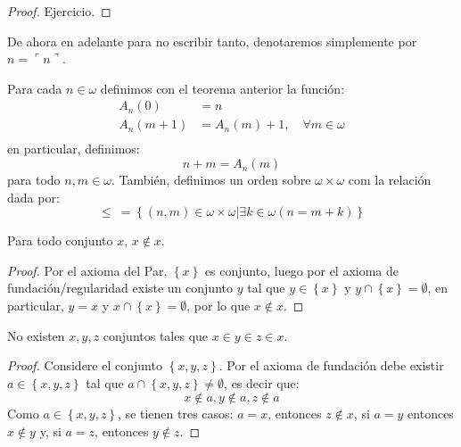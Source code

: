 \documentclass[12pt]{report}
\newcounter{it}
\theoremstyle{largebreak}
\newcommand{\winecomma}[1]{\ensuremath{\ulcorner#1\urcorner}}
\begin{document}
    \begin{proof}
        Ejercicio.
    \end{proof}

    \begin{obs}
        De ahora en adelante para no escribir tanto, denotaremos simplemente por $n=\winecomma{n}$.
    \end{obs}

    \begin{mydef}
        Para cada $n\in\omega$ definimos con el teorema anterior la función:
        \begin{equation*}
            \begin{split}
                A_n(0)&=n\\
                A_n(m+1)&=A_n(m)+1,\quad\forall m\in\omega \\
            \end{split}
        \end{equation*}
        en particular, definimos:
        \begin{equation*}
            n+m=A_n(m)
        \end{equation*}
        para todo $n,m\in\omega$. También, definimos un orden sobre $\omega\times\omega$ com la relación dada por:
        \begin{equation*}
            \leq \:= \left\{(n,m)\in\omega\times\omega\Big|\exists k\in\omega(n=m+k)\right\}
        \end{equation*}
    \end{mydef}

    \begin{propo}
        \label{noPertenenciaSiMismo}
        Para todo conjunto $x$, $x\notin x$.
    \end{propo}

    \begin{proof}
        Por el axioma del Par, $\left\{x\right\}$ es conjunto, luego por el axioma de fundación/regularidad existe un conjunto $y$ tal que $y\in\left\{x\right\}$ y $y\cap\left\{x\right\}=\emptyset$, en particular, $y=x$ y $x\cap\left\{x\right\}=\emptyset$, por lo que $x\notin x$.
    \end{proof}

    \begin{propo}
        No existen $x,y,z$ conjuntos tales que $x\in y\in z\in x$.
    \end{propo}

    \begin{proof}
        Considere el conjunto $\left\{x,y,z\right\}$. Por el axioma de fundación debe existir $a\in\left\{x,y,z\right\}$ tal que $a\cap\left\{x,y,z \right\}\neq\emptyset$, es decir que:
        \begin{equation*}
            x\notin a,y\notin a,z\notin a
        \end{equation*}
        Como $a\in\left\{x,y,z\right\}$, se tienen tres casos: $a=x$, entonces $z\notin x$, si $a=y$ entonces $x\notin y$ y, si $a=z$, entonces $y\notin z$.
    \end{proof}
\end{document}
